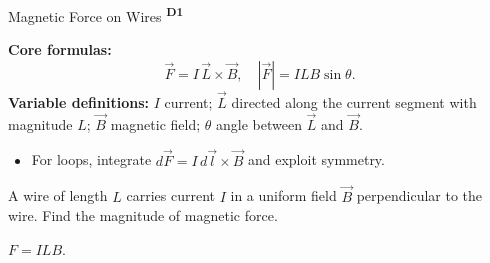 ﻿\documentclass[12pt,a4paper]{article}
\providecommand{\KPFormulas}{}
\providecommand{\KPHeuristics}{}
\providecommand{\KPProblems}{}
\newcommand{\DOne}{\texorpdfstring{\textsuperscript{\textbf{D1}}}{ D1}}
\begin{document}
\begin{KnowledgePoint}{Magnetic Force on Wires \DOne}
  \KPFormulas
  \begin{formulabox}
  \textbf{Core formulas:}
  \[
    \vec F=I\,\vec L\times\vec B,\quad |\vec F|=ILB\sin\theta.
  \]
  \textbf{Variable definitions:} $I$ current; $\vec L$ directed along the current segment with magnitude $L$; $\vec B$ magnetic field; $\theta$ angle between $\vec L$ and $\vec B$.
  \end{formulabox}

  \KPHeuristics
  \begin{heuristicsbox}
  \begin{itemize}[leftmargin=*]
    \item For loops, integrate $d\vec F=I\,d\vec l\times\vec B$ and exploit symmetry.
  \end{itemize}
  \end{heuristicsbox}

  \KPProblems
  \begin{cheatproblem}
  A wire of length $L$ carries current $I$ in a uniform field $\vec B$ perpendicular to the wire. Find the magnitude of magnetic force.
  \begin{solutionbox}
  $F=ILB$.
  \end{solutionbox}
  \end{cheatproblem}
\end{KnowledgePoint}
\end{document}
